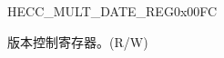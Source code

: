 \begin{register}{H}{ECC\_MULT\_DATE\_REG}{0x00FC}\label{regdesc:ECCMULTDATEREG}
%
%
\regnewline%
\begin{regdesc}\begin{reglist}
\label{fielddesc:ECCMULTDATE}\item [ECC\_MULT\_DATE] 版本控制寄存器。(R/W)
\end{reglist}\end{regdesc}
\end{register}
